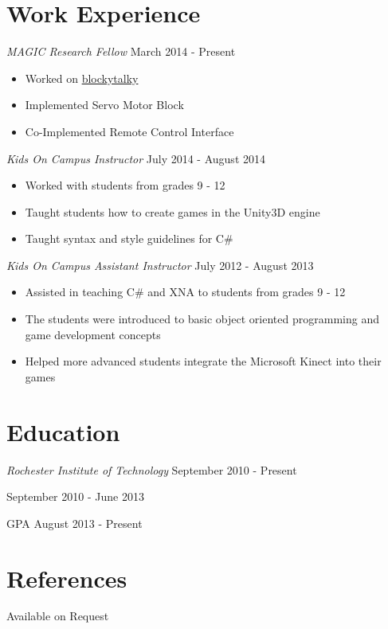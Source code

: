 \documentclass[line,margin]{res}
\begin{document}
\begin{resume}
\section{Work Experience}
{\sl MAGIC Research Fellow} \hfill March 2014 - Present
\begin{itemize}
\itemsep1pt\parskip0pt
\item
  Worked on
  \href{https://github.com/liam-middlebrook/blockytalky.git}{blockytalky}
\item
  Implemented Servo Motor Block
\item
  Co-Implemented Remote Control Interface
\end{itemize}

{\sl Kids On Campus Instructor} \hfill July 2014 - August 2014
\begin{itemize}
\itemsep1pt\parskip0pt
\item
  Worked with students from grades 9 - 12
\item
  Taught students how to create games in the Unity3D engine
\item
  Taught syntax and style guidelines for C\#
\end{itemize}

{\sl Kids On Campus Assistant Instructor} \hfill July 2012 - August 2013
\begin{itemize}
\itemsep1pt\parskip0pt
\item
  Assisted in teaching C\# and XNA to students from grades 9 - 12
\item
  The students were introduced to basic object oriented programming and
  game development concepts
\item
  Helped more advanced students integrate the Microsoft Kinect into
  their games
\end{itemize}


\section{Education}
{\sl Rochester Institute of Technology} \hfill September 2010 - Present

 \hfill September 2010 - June 2013

  GPA \hfill August 2013 - Present


\section{References}
Available on Request


\end{resume}
\end{document}
